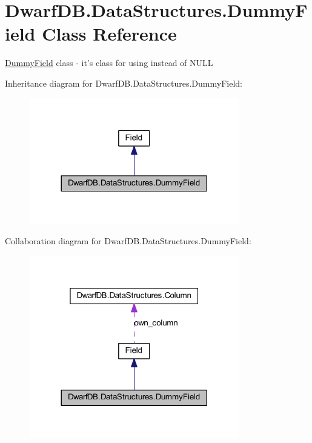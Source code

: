 \hypertarget{class_dwarf_d_b_1_1_data_structures_1_1_dummy_field}{\section{Dwarf\+D\+B.\+Data\+Structures.\+Dummy\+Field Class Reference}
\label{class_dwarf_d_b_1_1_data_structures_1_1_dummy_field}
}


\hyperlink{class_dwarf_d_b_1_1_data_structures_1_1_dummy_field}{Dummy\+Field} class -\/ it's class for using instead of N\+U\+L\+L  




Inheritance diagram for Dwarf\+D\+B.\+Data\+Structures.\+Dummy\+Field\+:
\nopagebreak
\begin{figure}[H]
\begin{center}
\leavevmode
\includegraphics[width=260pt]{class_dwarf_d_b_1_1_data_structures_1_1_dummy_field__inherit__graph}
\end{center}
\end{figure}


Collaboration diagram for Dwarf\+D\+B.\+Data\+Structures.\+Dummy\+Field\+:
\nopagebreak
\begin{figure}[H]
\begin{center}
\leavevmode
\includegraphics[width=260pt]{class_dwarf_d_b_1_1_data_structures_1_1_dummy_field__coll__graph}
\end{center}
\end{figure}
